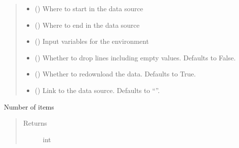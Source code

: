 \documentclass[letterpaper,10pt,english]{sphinxmanual}
\begin{document}
\begin{fulllineitems}
\begin{fulllineitems}
\begin{quote}
\begin{description}
\begin{itemize}
\item {} 
\sphinxAtStartPar
{} () \textendash{} Where to start in the data source

\item {} 
\sphinxAtStartPar
{} () \textendash{} Where to end in the data source

\item {} 
\sphinxAtStartPar
{} () \textendash{} Input variables for the environment

\item {} 
\sphinxAtStartPar
{} (\sphinxstyleliteralemphasis{\sphinxupquote{, }}) \textendash{} Whether to drop lines including empty values. Defaults to False.

\item {} 
\sphinxAtStartPar
{} (\sphinxstyleliteralemphasis{\sphinxupquote{, }}) \textendash{} Whether to re\sphinxhyphen{}download the data. Defaults to True.

\item {} 
\sphinxAtStartPar
{} (\sphinxstyleliteralemphasis{\sphinxupquote{, }}) \textendash{} Link to the data source. Defaults to “”.

\end{itemize}

\end{description}\end{quote}

\end{fulllineitems}


\begin{fulllineitems}
\label{\detokenize{DataLoader:crypto_env.dataloader.ETHLoader.__len__}}
\sphinxAtStartPar
Number of items
\begin{quote}\begin{description}
\item[{Returns}] \leavevmode
\sphinxAtStartPar
int


\end{description}
\end{quote}
\end{fulllineitems}
\end{fulllineitems}
\end{document}

